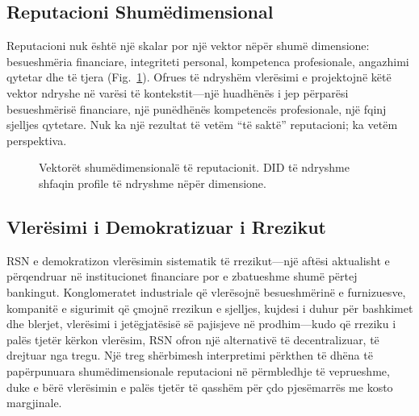 \documentclass[11pt,a4paper,twocolumn]{article}
\begin{document}
\subsection{Reputacioni Shumëdimensional}

Reputacioni nuk është një skalar por një vektor nëpër shumë dimensione: besueshmëria financiare, integriteti personal, kompetenca profesionale, angazhimi qytetar dhe të tjera (Fig.~\ref{fig:reputation-radar}). Ofrues të ndryshëm vlerësimi e projektojnë këtë vektor ndryshe në varësi të kontekstit---një huadhënës i jep përparësi besueshmërisë financiare, një punëdhënës kompetencës profesionale, një fqinj sjelljes qytetare. Nuk ka një rezultat të vetëm ``të saktë'' reputacioni; ka vetëm perspektiva.

\begin{figure}[ht]
\centering
{}
\caption{Vektorët shumëdimensionalë të reputacionit. DID të ndryshme shfaqin profile të ndryshme nëpër dimensione.}
\label{fig:reputation-radar}
\end{figure}

\subsection{Vlerësimi i Demokratizuar i Rrezikut}

RSN e demokratizon vlerësimin sistematik të rrezikut---një aftësi aktualisht e përqendruar në institucionet financiare por e zbatueshme shumë përtej bankingut. Konglomeratet industriale që vlerësojnë besueshmërinë e furnizuesve, kompanitë e sigurimit që çmojnë rrezikun e sjelljes, kujdesi i duhur për bashkimet dhe blerjet, vlerësimi i jetëgjatësisë së pajisjeve në prodhim---kudo që rreziku i palës tjetër kërkon vlerësim, RSN ofron një alternativë të decentralizuar, të drejtuar nga tregu. Një treg shërbimesh interpretimi përkthen të dhëna të papërpunuara shumëdimensionale reputacioni në përmbledhje të veprueshme, duke e bërë vlerësimin e palës tjetër të qasshëm për çdo pjesëmarrës me kosto margjinale.
\end{document}
